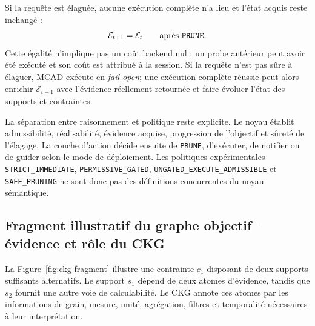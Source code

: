 \documentclass[journal]{IEEEtran}
\begin{document}
Si la requête est élaguée, aucune exécution complète n'a lieu et l'état acquis reste inchangé :
\[
\mathcal{E}_{t+1}=\mathcal{E}_t\qquad\text{après \texttt{PRUNE}}.
\]
Cette égalité n'implique pas un coût backend nul : un probe antérieur peut avoir été exécuté et son coût est attribué à la session. Si la requête n'est pas sûre à élaguer, MCAD exécute en \emph{fail-open}; une exécution complète réussie peut alors enrichir $\mathcal{E}_{t+1}$ avec l'évidence réellement retournée et faire évoluer l'état des supports et contraintes.

La séparation entre raisonnement et politique reste explicite. Le noyau établit admissibilité, réalisabilité, évidence acquise, progression de l'objectif et sûreté de l'élagage. La couche d'action décide ensuite de \texttt{PRUNE}, d'exécuter, de notifier ou de guider selon le mode de déploiement. Les politiques expérimentales \texttt{STRICT\_IMMEDIATE}, \texttt{PERMISSIVE\_GATED}, \texttt{UNGATED\_EXECUTE\_ADMISSIBLE} et \texttt{SAFE\_PRUNING} ne sont donc pas des définitions concurrentes du noyau sémantique.

\subsection{Fragment illustratif du graphe objectif--évidence et rôle du CKG}

La Figure~\ref{fig:ckg-fragment} illustre une contrainte $c_1$ disposant de deux supports suffisants alternatifs. Le support $s_1$ dépend de deux atomes d'évidence, tandis que $s_2$ fournit une autre voie de calculabilité. Le CKG annote ces atomes par les informations de grain, mesure, unité, agrégation, filtres et temporalité nécessaires à leur interprétation.
\end{document}
